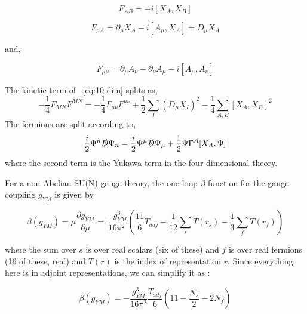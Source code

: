 \begin{equation}
F_{AB} = -i[X_{A}, X_{B}] 
\end{equation}

\begin{equation}
F_{\mu A} = \partial_{\mu} X_{A} -i [A_{\mu}, X_{A}]  = D_{\mu} X_{A} 
\end{equation}

and, 

\begin{equation}
F_{\mu \nu} = \partial_{\mu} A_{\nu} - \partial_{\nu} A_{\mu} -i [A_{\mu}, A_{\nu}] 
\end{equation}

The kinetic term of ~\ref{eq:10-dim} splits as, 
\begin{equation}
-\frac{1}{4} F_{MN}F^{MN} = -\frac{1}{4} F_{\mu\nu}F^{\mu\nu} + \frac{1}{2} \sum_{I} (D_{\mu} X_{I})^{2}   - \frac{1}{4} \sum_{A,B} [X_{A}, X_{B}]^{2} 
\end{equation}
The fermions are split according to, 
\begin{equation}
\frac{i}{2} \Psi^{n} \slashed{D} \Psi_{n} = \frac{i}{2} \Psi^{\mu} \slashed{D} \Psi_{\mu} + \frac{1}{2} \Psi \Gamma^{A}[X_{A}, \Psi] 
\end{equation}
where the second term is the Yukawa term in the four-dimensional theory. 


For a non-Abelian SU(N) gauge theory, the one-loop $\beta$ 
function for the gauge coupling $g_{YM}$ is given by \cite{Gross:1973ju, 2012LMaPh..99...33M}
 
 
 \begin{equation}
 \beta(g_{YM}) = \mu \frac{\partial g_{YM}}{\partial \mu} = \frac{-g_{YM}^{3}}{16 \pi^{2}} \left ( \frac{11}{6}T_{adj} - \frac{1}{12} \sum_{s} T(r_{s}) - \frac{1}{3} \sum_{f} T(r_{f}) \right) 
 \end{equation}
 
where the sum over $s$ is over real scalars (six of these) and $f$ is over 
real fermions (16 of these, real) and $T(r)$ is the index of representation $r$. 
Since everything here is in adjoint representations, we can simplify it as : 
 
 \begin{equation}
   \beta(g_{YM}) = -\frac{g_{YM}^{3}}{16\pi^{2}}\frac{T_{adj}}{6}\left(11 - \frac{N_{s}}{2} - 2N_{f} \right) 
 \end{equation}
 

